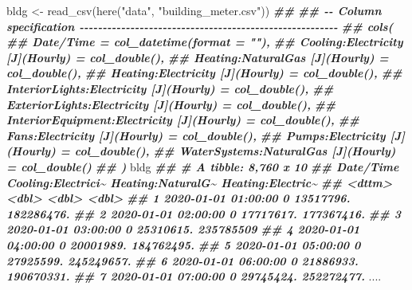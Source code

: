 \documentclass[
]{book}
\newenvironment{Shaded}{\begin{snugshade}}{\end{snugshade}}
\newcommand{\DocumentationTok}[1]{\textcolor[rgb]{0.56,0.35,0.01}{\textbf{\textit{#1}}}}
\newcommand{\FunctionTok}[1]{\textcolor[rgb]{0.00,0.00,0.00}{#1}}
\newcommand{\NormalTok}[1]{#1}
\newcommand{\OtherTok}[1]{\textcolor[rgb]{0.56,0.35,0.01}{#1}}
\newcommand{\StringTok}[1]{\textcolor[rgb]{0.31,0.60,0.02}{#1}}
\begin{document}
\begin{Shaded}
\begin{Highlighting}[]
\NormalTok{bldg }\OtherTok{\textless{}{-}} \FunctionTok{read\_csv}\NormalTok{(}\FunctionTok{here}\NormalTok{(}\StringTok{"data"}\NormalTok{, }\StringTok{"building\_meter.csv"}\NormalTok{))}
\DocumentationTok{\#\# }
\DocumentationTok{\#\# {-}{-} Column specification {-}{-}{-}{-}{-}{-}{-}{-}{-}{-}{-}{-}{-}{-}{-}{-}{-}{-}{-}{-}{-}{-}{-}{-}{-}{-}{-}{-}{-}{-}{-}{-}{-}{-}{-}{-}{-}{-}{-}{-}{-}{-}{-}{-}{-}{-}{-}{-}{-}{-}{-}{-}{-}{-}{-}{-}}
\DocumentationTok{\#\# cols(}
\DocumentationTok{\#\#   \textasciigrave{}Date/Time\textasciigrave{} = col\_datetime(format = ""),}
\DocumentationTok{\#\#   \textasciigrave{}Cooling:Electricity [J](Hourly)\textasciigrave{} = col\_double(),}
\DocumentationTok{\#\#   \textasciigrave{}Heating:NaturalGas [J](Hourly)\textasciigrave{} = col\_double(),}
\DocumentationTok{\#\#   \textasciigrave{}Heating:Electricity [J](Hourly)\textasciigrave{} = col\_double(),}
\DocumentationTok{\#\#   \textasciigrave{}InteriorLights:Electricity [J](Hourly)\textasciigrave{} = col\_double(),}
\DocumentationTok{\#\#   \textasciigrave{}ExteriorLights:Electricity [J](Hourly)\textasciigrave{} = col\_double(),}
\DocumentationTok{\#\#   \textasciigrave{}InteriorEquipment:Electricity [J](Hourly)\textasciigrave{} = col\_double(),}
\DocumentationTok{\#\#   \textasciigrave{}Fans:Electricity [J](Hourly)\textasciigrave{} = col\_double(),}
\DocumentationTok{\#\#   \textasciigrave{}Pumps:Electricity [J](Hourly)\textasciigrave{} = col\_double(),}
\DocumentationTok{\#\#   \textasciigrave{}WaterSystems:NaturalGas [J](Hourly)\textasciigrave{} = col\_double()}
\DocumentationTok{\#\# )}
\NormalTok{bldg}
\DocumentationTok{\#\# \# A tibble: 8,760 x 10}
\DocumentationTok{\#\#    \textasciigrave{}Date/Time\textasciigrave{}         \textasciigrave{}Cooling:Electrici\textasciitilde{} \textasciigrave{}Heating:NaturalG\textasciitilde{} \textasciigrave{}Heating:Electric\textasciitilde{}}
\DocumentationTok{\#\#    \textless{}dttm\textgreater{}                            \textless{}dbl\textgreater{}              \textless{}dbl\textgreater{}              \textless{}dbl\textgreater{}}
\DocumentationTok{\#\#  1 2020{-}01{-}01 01:00:00                   0          13517796.         182286476.}
\DocumentationTok{\#\#  2 2020{-}01{-}01 02:00:00                   0          17717617.         177367416.}
\DocumentationTok{\#\#  3 2020{-}01{-}01 03:00:00                   0          25310615.         235785509 }
\DocumentationTok{\#\#  4 2020{-}01{-}01 04:00:00                   0          20001989.         184762495.}
\DocumentationTok{\#\#  5 2020{-}01{-}01 05:00:00                   0          27925599.         245249657.}
\DocumentationTok{\#\#  6 2020{-}01{-}01 06:00:00                   0          21886933.         190670331.}
\DocumentationTok{\#\#  7 2020{-}01{-}01 07:00:00                   0          29745424.         252272477.}
\NormalTok{....}
\end{Highlighting}
\end{Shaded}
\end{document}

